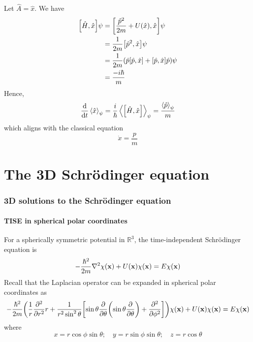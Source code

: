 \documentclass[a4paper]{article}
\begin{document}
\begin{example}
	Let \( \hat A = \hat x \).
	We have
	\begin{align*}
		\qty[\hat H, \hat x] \psi & = \qty[\frac{\hat p^2}{2m} + U(\hat x), \hat x] \psi                                 \\
		                          & = \frac{1}{2m} \qty[\hat p^2, \hat x] \psi                                           \\
		                          & = \frac{1}{2m} \qty( \hat p \qty[\hat p, \hat x] + \qty[\hat p, \hat x] \hat p) \psi \\
		                          & = \frac{-i\hbar}{m}
	\end{align*}
	Hence,
	\[
		\dv{t}\left\langle{\hat x}\right\rangle_\psi = \frac{i}{\hbar} \left\langle{\qty[\hat H, \hat x]}\right\rangle_\psi = \frac{\left\langle{\hat p}\right\rangle_\psi}{m}
	\]
	which aligns with the classical equation
	\[
		\dot x = \frac{p}{m}
	\]
\end{example}
\clearpage
\part{The 3D Schr\"odinger equation}
\section{3D solutions to the Schr\"odinger equation}
\subsection{TISE in spherical polar coordinates}

For a spherically symmetric potential in \( \mathbb R^3 \), the time-independent Schr\"odinger equation is
\[
	-\frac{\hbar^2}{2m} \laplacian{\chi(\bfx)} + U(\bfx) \chi(\bfx) = E\chi(\bfx)
\]
Recall that the Laplacian operator can be expanded in spherical polar coordinates as
\[
	-\frac{\hbar^2}{2m} \qty( \frac{1}{r} \pdv[2]{r} r + \frac{1}{r^2\sin^2\theta}\qty[\sin \theta \pdv{\theta}\qty(\sin\theta \pdv{\theta}) + \pdv[2]{\phi}] )\chi({\bf x}) + U({\bf x}) \chi({\bf x}) = E\chi({\bf x})
\]
where
\[
	x = r \cos \phi \sin \theta; \quad y = r \sin \phi \sin \theta;\quad z = r \cos \theta
\]
\end{document}
